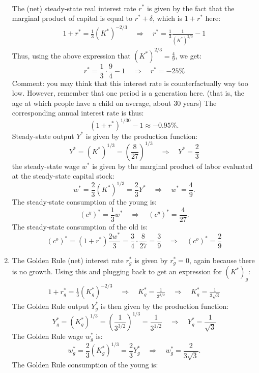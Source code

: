 \documentclass[]{book}
\theoremstyle{definition}
\theoremstyle{definition}
\theoremstyle{definition}
\theoremstyle{remark}
\begin{document}
\begin{enumerate}
\[\begin{aligned}
  \end{aligned}
  \] The (net) steady-state real interest rate \(r^{*}\) is given by the
  fact that the marginal product of capital is equal to
  \(r^{*} + \delta\), which is \(1+r^{*}\) here: \[
  \begin{aligned}
  1+r^{*} = \frac{1}{3}(K^{*})^{-2/3} \quad \Rightarrow \quad r^{*}=\frac{1}{3}\frac{1}{(K^{*})^{2/3}}-1
  \end{aligned}
  \] Thus, using the above expression that
  \((K^{*})^{2/3} = \frac{4}{9}\), we get:
  \[r^{*}=\frac{1}{3} \cdot \frac{9}{4}-1 \quad \Rightarrow \quad  \boxed{r^{*}= -25\%}\]
  Comment: you may think that this interest rate is counterfactually way
  too low. However, remember that one period is a generation here. (that
  is, the age at which people have a child on average, about 30 years)
  The corresponding annual interest rate is thus:
  \[(1+r^{*})^{1/30}-1 \approx -0.95\%.\] Steady-state output \(Y^{*}\)
  is given by the production function:
  \[Y^{*} = (K^{*})^{1/3} = \left(\frac{8}{27}\right)^{1/3} \quad \Rightarrow \quad \boxed{Y^{*} =\frac{2}{3}}\]
  the steady-state wage \(w^{*}\) is given by the marginal product of
  labor evaluated at the steady-state capital stock:
  \[w^{*}=\frac{2}{3}(K^{*})^{1/3}=\frac{2}{3}Y^{*} \quad \Rightarrow \quad \boxed{w^{*} = \frac{4}{9}}.\]
  The steady-state consumption of the young is:
  \[(c^y)^{*} = \frac{1}{3}w^{*} \quad \Rightarrow \quad \boxed{(c^y)^{*} = \frac{4}{27}}.\]
  The steady-state consumption of the old is:
  \[(c^o)^{*} = (1+r^{*})\frac{2w^{*}}{3} = \frac{3}{4} \cdot \frac{8}{27} = \frac{3}{9} \quad \Rightarrow \quad \boxed{(c^o)^{*} = \frac{2}{9}}\]
\item
  The Golden Rule (net) interest rate \(r^{*}_g\) is given by
  \(r^{*}_g=0\), again because there is no growth. Using this and
  plugging back to get an expression for \((K^{*})_g\): \[
  \begin{aligned}
  1+r^{*}_g = \frac{1}{3}(K^{*}_g)^{-2/3} \quad \Rightarrow \quad K_g^{*}=\frac{1}{3^{3/2}} \quad \Rightarrow \quad \boxed{K_g^{*}=\frac{1}{3\sqrt{3}}}
  \end{aligned}
  \] The Golden Rule output \(Y^{*}_g\) is then given by the production
  function:
  \[Y^{*}_g=(K^{*}_g)^{1/3} = \left(\frac{1}{3^{3/2}}\right)^{1/3} = \frac{1}{3^{1/2}} \quad \Rightarrow \quad \boxed{Y^{*}_g = \frac{1}{\sqrt{3}}}\]
  The Golden Rule wage \(w^{*}_g\) is:
  \[w^{*}_g=\frac{2}{3}(K^{*}_g)^{1/3}=\frac{2}{3}Y^{*}_g \quad \Rightarrow \quad \boxed{w^{*}_g = \frac{2}{3\sqrt{3}}}.\]
  The Golden Rule consumption of the young is:

\end{enumerate}
\end{document}
